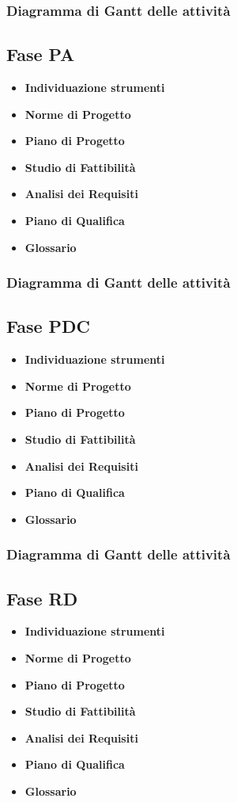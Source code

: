 		\subsubsection{Diagramma di Gantt delle attività}
		
	\subsection{Fase PA}
		\begin{itemize}
			\item \textbf{Individuazione strumenti} 
			\item \textbf{Norme di Progetto}
			\item \textbf{Piano di Progetto}
			\item \textbf{Studio di Fattibilità}
			\item \textbf{Analisi dei Requisiti}
			\item \textbf{Piano di Qualifica}
			\item \textbf{Glossario}
		\end{itemize}
		\subsubsection{Diagramma di Gantt delle attività}
		
	\subsection{Fase PDC}
		\begin{itemize}
			\item \textbf{Individuazione strumenti} 
			\item \textbf{Norme di Progetto}
			\item \textbf{Piano di Progetto}
			\item \textbf{Studio di Fattibilità}
			\item \textbf{Analisi dei Requisiti}
			\item \textbf{Piano di Qualifica}
			\item \textbf{Glossario}
		\end{itemize}
		\subsubsection{Diagramma di Gantt delle attività}
		
	\subsection{Fase RD}
		\begin{itemize}
			\item \textbf{Individuazione strumenti} 
			\item \textbf{Norme di Progetto}
			\item \textbf{Piano di Progetto}
			\item \textbf{Studio di Fattibilità}
			\item \textbf{Analisi dei Requisiti}
			\item \textbf{Piano di Qualifica}
			\item \textbf{Glossario}
		\end{itemize}
